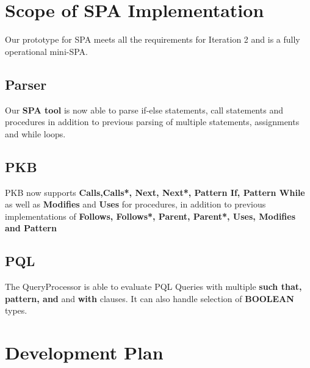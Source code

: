 \documentclass[12pt]{article}
\begin{document}

\tableofcontents
\vspace{200mm}
\section{Scope of SPA Implementation}
Our prototype for SPA meets all the requirements for Iteration 2 and is a fully operational mini-SPA.
\subsection{Parser}
Our \textbf{SPA tool} is now able to parse if-else statements, call statements and procedures in addition to previous parsing of multiple statements, assignments and while loops. 
\subsection{PKB}
PKB now supports \textbf{Calls,Calls*, Next, Next*, Pattern If, Pattern While} as well as \textbf{Modifies} and \textbf{Uses} for procedures, in addition to previous implementations of \textbf{Follows, Follows*, Parent, Parent*, Uses, Modifies and Pattern}
\subsection{PQL}
The QueryProcessor is able to evaluate PQL Queries with multiple \textbf{such that, pattern, and} and \textbf{with} clauses. It can also handle selection of \textbf{BOOLEAN} types.
\section{Development Plan}
\end{document}
